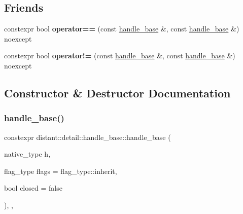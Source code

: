 \subsection*{Friends}
\begin{DoxyCompactItemize}
\item 
\mbox{\label{classdistant_1_1detail_1_1handle__base_ae79375b4f4c33db8b147562e2ae3ef5d}} 
constexpr bool {\bfseries operator==} (const \mbox{\hyperlink{classdistant_1_1detail_1_1handle__base}{handle\+\_\+base}} \&, const \mbox{\hyperlink{classdistant_1_1detail_1_1handle__base}{handle\+\_\+base}} \&) noexcept
\item 
\mbox{\label{classdistant_1_1detail_1_1handle__base_a5d3970f4614aa751704be5d8749066e2}} 
constexpr bool {\bfseries operator!=} (const \mbox{\hyperlink{classdistant_1_1detail_1_1handle__base}{handle\+\_\+base}} \&, const \mbox{\hyperlink{classdistant_1_1detail_1_1handle__base}{handle\+\_\+base}} \&) noexcept
\end{DoxyCompactItemize}


\subsection{Constructor \& Destructor Documentation}
\mbox{\label{classdistant_1_1detail_1_1handle__base_a9f2003ece2e3183973e4fc9d7e6c99a7}} 
\subsubsection{\texorpdfstring{handle\+\_\+base()}{handle\_base()}\hspace{0.1cm}{\footnotesize\ttfamily [1/3]}}
{\footnotesize\ttfamily constexpr distant\+::detail\+::handle\+\_\+base\+::handle\+\_\+base (\begin{DoxyParamCaption}\item[{native\+\_\+type}]{h,  }\item[{flag\+\_\+type}]{flags = {\ttfamily flag\+\_\+type\+:\+:inherit},  }\item[{bool}]{closed = {\ttfamily false} }\end{DoxyParamCaption})\hspace{0.3cm}{\ttfamily [inline]}, {\ttfamily [explicit]}, {\ttfamily [noexcept]}}

